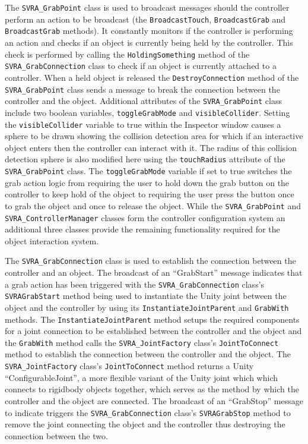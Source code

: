 \documentclass{l4proj}
\begin{document}
The \texttt{SVRA\_GrabPoint} class is used to broadcast messages should the controller perform an action to be broadcast (the \texttt{BroadcastTouch}, \texttt{BroadcastGrab} and \texttt{BroadcastGrab} methods). It constantly monitors if the controller is performing an action and checks if an object is  currently being held by the controller. This check is performed by calling the \texttt{HoldingSomething} method of the \texttt{SVRA\_GrabConnection} class to check if an object is currently attached to a controller. When a held object is released the \texttt{DestroyConnection} method of the \texttt{SVRA\_GrabPoint} class sends a message to break the connection between the controller and the object. Additional attributes of the \texttt{SVRA\_GrabPoint} class include two boolean variables, \texttt{toggleGrabMode} and \texttt{visibleCollider}. Setting the \texttt{visibleCollider} variable to true within the Inspector window causes a sphere to be drawn showing the collision detection area for which if an interactive object enters then the controller can interact with it. The radius of this collision detection sphere is also modified here using the \texttt{touchRadius} attribute of the \texttt{SVRA\_GrabPoint} class. The \texttt{toggleGrabMode} variable if set to true switches the grab action logic from requiring the user to hold down the grab button on the controller to keep hold of the object to requiring the user press the button once to grab the object and once to release the object. While the \texttt{SVRA\_GrabPoint} and \texttt{SVRA\_ControllerManager} classes form the controller configuration system an additional three classes provide the remaining functionality required for the object interaction system.

The \texttt{SVRA\_GrabConnection} class is used to establish the connection between the controller and an object. The broadcast of an ``GrabStart'' message indicates that a grab action has been triggered with the \texttt{SVRA\_GrabConnection} class's \texttt{SVRAGrabStart} method being used to instantiate the Unity joint between the object and the controller by using its \texttt{InstantiateJointParent} and \texttt{GrabWith} methods. The \texttt{InstantiateJointParent} method setups the required components for a joint connection to be established between the controller and the object and the \texttt{GrabWith} method calls the \texttt{SVRA\_JointFactory} class's \texttt{JointToConnect} method to establish the connection between the controller and the object. The \texttt{SVRA\_JointFactory} class's \texttt{JointToConnect} method returns a Unity ``ConfigurableJoint'', a more flexible variant of the Unity joint which which connects to rigidbody objects together, which serves as the method by which the controller and the object are connected. The broadcast of an ``GrabStop'' message to indicate triggers the \texttt{SVRA\_GrabConnection} class's \texttt{SVRAGrabStop} method to remove the joint connecting the object and the controller thus destroying the connection between the two. 
\end{document}
